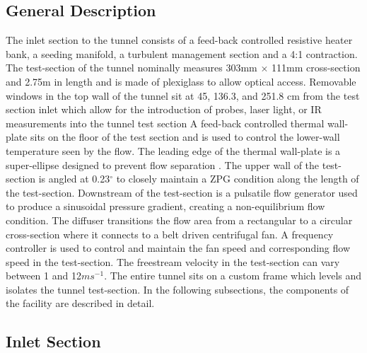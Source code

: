 \subsection{General Description}
The inlet section to the tunnel consists of a feed-back controlled resistive heater bank, a seeding manifold, a turbulent management section and a 4:1 contraction. 
The test-section of the tunnel nominally measures 303mm $\times$ 111mm cross-section and 2.75m in length and is made of plexiglass to allow optical access.
Removable windows in the top wall of the tunnel sit at 45, 136.3, and 251.8 cm from the test section inlet which allow for the introduction of probes, laser light, or IR measurements into the tunnel test section 
A feed-back controlled thermal wall-plate sits on the floor of the test section and is used to control the lower-wall temperature seen by the flow. 
The leading edge of the thermal wall-plate is a super-ellipse designed to prevent flow separation \cite{R.Narasimha1994}. 
The upper wall of the test-section is angled at 0.23$^\circ$ to closely maintain a ZPG condition along the length of the test-section. 
Downstream of the test-section is a pulsatile flow generator used to produce a sinusoidal pressure gradient, creating a non-equilibrium flow condition. 
The diffuser transitions the flow area from a rectangular to a circular cross-section where it connects to a belt driven centrifugal fan.  
A frequency controller is used to control and maintain the fan speed and corresponding flow speed in the test-section. 
The freestream velocity in the test-section can vary between 1 and 12$ms^{-1}$. 
The entire tunnel sits on a custom frame which levels and isolates the tunnel test-section.
In the following subsections, the components of the facility are described in detail.


\subsection{Inlet Section}

